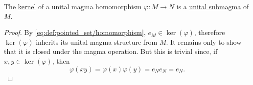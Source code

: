\begin{proposition}\label{thm:unital_magma_kernel_is_submagma}
  The \hyperref[def:pointed_set_kernel]{kernel} of a unital magma homomorphism \( \varphi: M \to N \) is a \hyperref[def:first_order_substructure]{unital submagma} of \( M \).
\end{proposition}
\begin{proof}
  By \eqref{eq:def:pointed_set/homomorphism}, \( e_{M} \in \ker(\varphi) \), therefore \( \ker(\varphi) \) inherits its unital magma structure from \( M \). It remains only to show that it is closed under the magma operation. But this is trivial since, if \( x, y \in \ker(\varphi) \), then
  \begin{equation*}
    \varphi(xy) = \varphi(x) \varphi(y) = e_{N} e_{N} = e_{N}.
  \end{equation*}
\end{proof}

